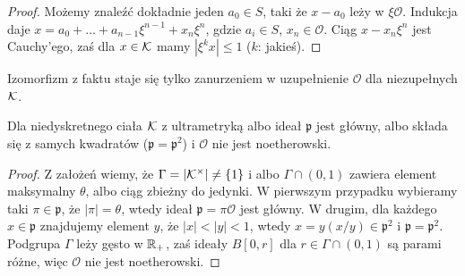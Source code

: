 \begin{proof}
	Możemy znaleźć dokładnie jeden $a_0 \in S$, taki że $x - a_0$ leży w $\xi \mathcal O$. 
	Indukcja daje $x = a_0 + \ldots + a_{n-1} \xi^{n-1} + x_n \xi^n$, gdzie $a_i \in S$, $x_n \in \mathcal O$.
	Ciąg $x - x_n \xi^n$ jest Cauchy'ego, zaś dla $x \in \mathcal K$ mamy $|\xi^k x| \le 1$ ($k$: jakieś).
\end{proof}


Izomorfizm z faktu staje się tylko zanurzeniem w uzupełnienie $\mathcal O$ dla niezupełnych $\mathcal K$.

\begin{fakt} 
	Dla  niedyskretnego ciała $\mathcal K$ z ultrametryką albo ideał $\mathfrak p$ jest główny, albo składa się z samych kwadratów ($\mathfrak p = \mathfrak p^2$) i $\mathcal O$ nie jest noetherowski.
\end{fakt}

\begin{proof}
	Z założeń wiemy, że $\Gamma = |\mathcal K^\times| \neq \{1\}$ i albo $\Gamma \cap (0, 1)$ zawiera element maksymalny $\theta$, albo ciąg zbieżny do jedynki.
	W pierwszym przypadku wybieramy taki $\pi \in \mathfrak p$, że $|\pi| = \theta$, wtedy ideał $\mathfrak p = \pi \mathcal O$ jest główny.
	W drugim, dla każdego $x \in \mathfrak p$ znajdujemy element $y$, że $|x| < |y| < 1$, wtedy $x = y (x/y) \in \mathfrak p^2$ i $\mathfrak p = \mathfrak p^2$.
	Podgrupa $\Gamma$ leży gęsto w $\mathbb R_+$, zaś ideały $B[0, r]$ dla $r \in \Gamma \cap (0,1)$ są parami różne, więc $\mathcal O$ nie jest noetherowski.
\end{proof}